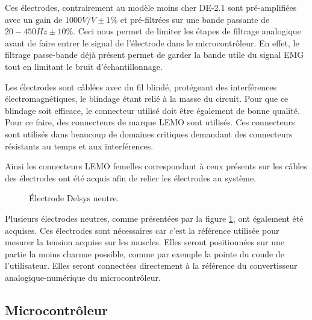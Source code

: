 \documentclass[letterpaper, twoside, 12pt, memoire, creativecommons, hyperref]{thETS}
\begin{document}
Ces électrodes, contrairement au modèle moins cher DE-2.1 sont pré-amplifiées avec un gain de $1000 V/V \pm 1\%$ et pré-filtrées sur une bande passante de $20-450 Hz \pm 10\%$. Ceci nous permet de limiter les étapes de filtrage analogique avant de faire entrer le signal de l'électrode dans le microcontrôleur. En effet, le filtrage passe-bande déjà présent permet de garder la bande utile du signal EMG tout en limitant le bruit d'échantillonnage.

Les électrodes sont câblées avec du fil blindé, protégeant des interférences électromagnétiques, le blindage étant relié à la masse du circuit. Pour que ce blindage soit efficace, le connecteur utilisé doit être également de bonne qualité. Pour ce faire, des connecteurs de marque LEMO sont utilisés. Ces connecteurs sont utilisés dans beaucoup de domaines critiques demandant des connecteurs résistants au temps et aux interférences. 

Ainsi les connecteurs LEMO femelles correspondant à ceux présents sur les câbles des électrodes ont été acquis afin de relier les électrodes au système.

\begin{figure}
	\centering
	\caption{Électrode Delsys neutre.}
	\label{fig:delsysneutre}
\end{figure}

Plusieurs électrodes neutres, comme présentées par la figure \ref{fig:delsysneutre}, ont également été acquises. Ces électrodes sont nécessaires car c'est la référence utilisée pour mesurer la tension acquise sur les muscles. Elles seront positionnées sur une partie la moins charnue possible, comme par exemple la pointe du coude de l'utilisateur. Elles seront connectées directement à la référence du convertisseur analogique-numérique du microcontrôleur.

\subsection{Microcontrôleur}\label{ch:microcon}
\end{document}
